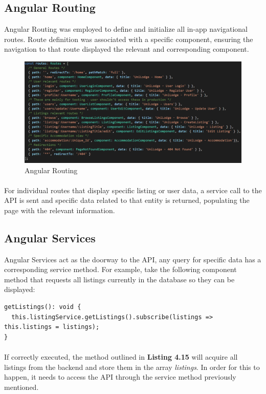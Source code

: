 \subsection{Angular Routing}
Angular Routing was employed to define and initialize all in-app navigational routes. Route definition was associated with a specific component, ensuring the navigation to that route displayed the relevant and corresponding component.

\begin{figure}[H]
	\caption{Angular Routing}
	\label{image:routing}
	\centering
	\includegraphics[width=1\textwidth]{images/routes.png}
\end{figure}

\paragraph{}
For individual routes that display specific listing or user data, a service call to the API is sent and specific data related to that entity is returned, populating the page with the relevant information.

\subsection{Angular Services}
Angular Services act as the doorway to the API, any query for specific data has a corresponding service method. For example, take the following component method that requests all listings currently in the database so they can be displayed:

\begin{lstlisting}[caption=Method for Acquiring all Listings]
getListings(): void {
  this.listingService.getListings().subscribe(listings => this.listings = listings);
}
\end{lstlisting}

\paragraph{}
If correctly executed, the method outlined in \textbf{Listing 4.15} will acquire all listings from the backend and store them in the array \textit{listings}. In order for this to happen, it needs to access the API through the service method previously mentioned.

